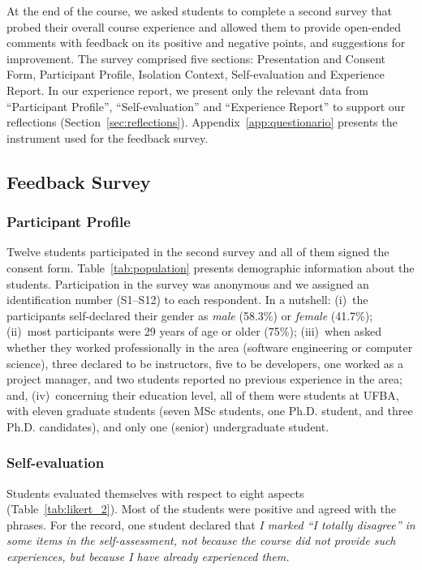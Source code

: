 \documentclass[sigconf]{acmart}
\begin{document}
At the end of the course, we asked students to complete a second survey that probed their overall course experience and allowed them to provide open-ended comments with feedback on its positive and negative points, and suggestions for improvement.
%
The survey comprised five sections: Presentation and Consent Form, Participant Profile, Isolation Context, Self-evaluation
and Experience Report. 
In our experience report, we present only the relevant data from ``Participant Profile'', ``Self-evaluation'' and ``Experience Report'' to support our reflections (Section~\ref{sec:reflections}). 
Appendix~\ref{app:questionario} presents the instrument used for the feedback survey.

\subsection{Feedback Survey}

\subsubsection{Participant Profile}

Twelve students participated in the second survey and all of them signed the consent form.
%
Table~\ref{tab:population} presents demographic information about the students. 
Participation in the survey was anonymous and we assigned an identification number (S1--S12) to each respondent.
%
In a nutshell: (i)~the participants self-declared their gender as \textit{male} (58.3\%) or \textit{female} (41.7\%);
(ii)~most participants were 29 years of age or older (75\%); (iii)~when asked whether they worked professionally in the area (software engineering or computer science), three declared to be instructors, five to be developers,  one worked as a project manager, and two students reported no previous experience in the area; and, (iv)~concerning their education level, all of them were students at UFBA, with eleven graduate students (seven MSc students, one Ph.D. student, and three Ph.D. candidates), 
and only one (senior) undergraduate student.



\subsubsection{Self-evaluation}

Students evaluated themselves with respect to eight aspects (Table~\ref{tab:likert_2}). Most of the students were positive and agreed with the phrases.
For the record, one student declared that 
\textit{I marked ``I totally disagree'' in some items in the self-assessment, not because the course did not provide such experiences, but because I have already experienced them.}
%
\end{document}

